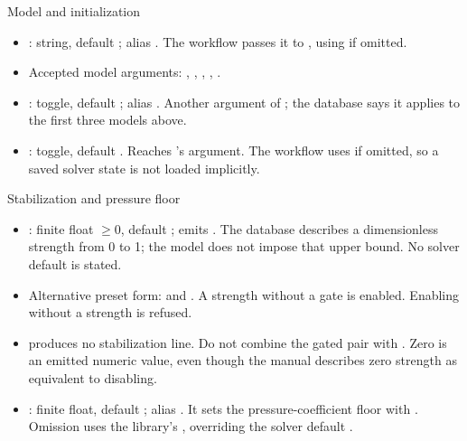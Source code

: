 \begin{frame}{Model and initialization}
\begin{itemize}\small
  \item {}: string, default ; alias
        . The workflow passes it to
        , using  if omitted.
  \item Accepted model arguments: ,
        , ,
        , .
  \item {}: toggle, default ;
        alias . Another argument of
        ; the database says it applies to
        the first three models above.
  \item {}: toggle, default .
        Reaches 's  argument.
        The workflow uses  if omitted, so a saved solver state
        is not loaded implicitly.
\end{itemize}
\end{frame}

\begin{frame}{Stabilization and pressure floor}
\begin{itemize}\small
  \item {}: finite float $\geq 0$, default
        ; emits .
        The database describes a dimensionless strength from 0 to 1;
        the model does not impose that upper bound. No solver default is stated.
  \item Alternative preset form:  and
        . A strength without a gate
        is enabled. Enabling without a strength is refused.
  \item {} produces no stabilization line.
        Do not combine the gated pair with .
        Zero is an emitted numeric value, even though the manual describes
        zero strength as equivalent to disabling.
  \item {}: finite float, default ; alias
        . It sets the pressure-coefficient floor
        with . Omission uses the library's
        , overriding the solver default .
\end{itemize}
\end{frame}

